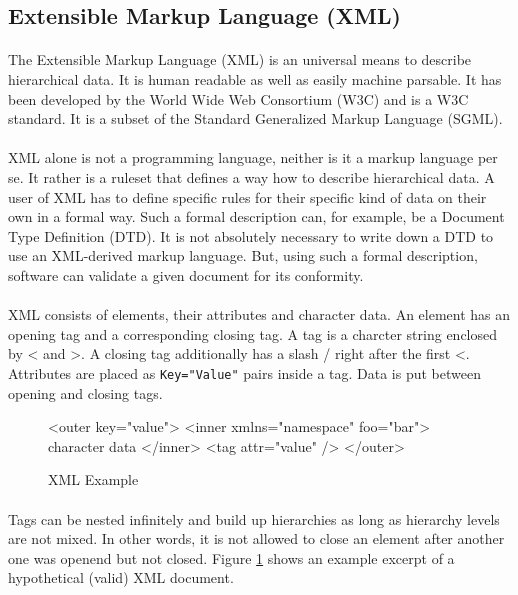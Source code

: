 \subsection{Extensible Markup Language (XML)}
\paragraph{}
The Extensible Markup Language (XML) is an universal means to describe hierarchical data. It is human readable as well as easily machine parsable. It has been developed by the World Wide Web Consortium (W3C) and is a W3C standard. It is a subset of the Standard Generalized Markup Language (SGML).

\paragraph{}
XML alone is not a programming language, neither is it a markup language per se. It rather is a ruleset that defines a way how to describe hierarchical data. A user of XML has to define specific rules for their specific kind of data on their own in a formal way. Such a formal description can, for example, be a Document Type Definition (DTD). It is not absolutely necessary to write down a DTD to use an XML-derived markup language. But, using such a formal description, software can validate a given document for its conformity.

\paragraph{}
XML consists of elements, their attributes and character data. An element has an opening tag and a corresponding closing tag. A tag is a charcter string enclosed by \glqq{}<\grqq{} and \glqq{}>\grqq{}. A closing tag additionally has a slash \glqq{}/\grqq{} right after the first \glqq{}<\grqq{}. Attributes are placed as \texttt{Key="Value"} pairs inside a tag. Data is put between opening and closing tags.

\begin{figure}[H]
\begin{listing}{1}
<outer key="value">
  <inner xmlns="namespace" foo="bar">
    character data
  </inner>
  <tag attr="value" />
</outer>
\end{listing}
\caption{XML Example}
\label{fig:XMLexample}
\end{figure}

\paragraph{}
Tags can be nested infinitely and build up hierarchies as long as hierarchy levels are not mixed. In other words, it is not allowed to close an element after another one was openend but not closed. Figure \ref{fig:XMLexample} shows an example excerpt of a hypothetical (valid) XML document.

